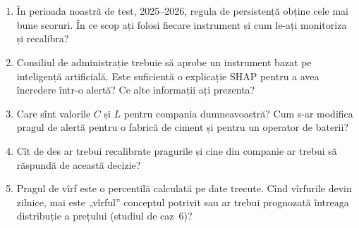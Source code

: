 \section{}
\begin{enumerate}
\item {}%
{În perioada noastră de test, 2025--2026, regula de persistență obține cele mai bune scoruri. În ce scop ați folosi fiecare instrument și cum le-ați monitoriza și recalibra?}
\item {}%
{Consiliul de administrație trebuie să aprobe un instrument bazat pe inteligență artificială. Este suficientă o explicație SHAP pentru a avea încredere într-o alertă? Ce alte informații ați prezenta?}
\item {}%
{Care sînt valorile $C$ și $L$ pentru compania dumneavoastră? Cum s-ar modifica pragul de alertă pentru o fabrică de ciment și pentru un operator de baterii?}
\item {}%
{Cît de des ar trebui recalibrate pragurile și cine din companie ar trebui să răspundă de această decizie?}
\item {}%
{Pragul de vîrf este o percentilă calculată pe date trecute. Cînd vîrfurile devin zilnice, mai este „vîrful” conceptul potrivit sau ar trebui prognozată întreaga distribuție a prețului (studiul de caz~6)?}
\end{enumerate}

